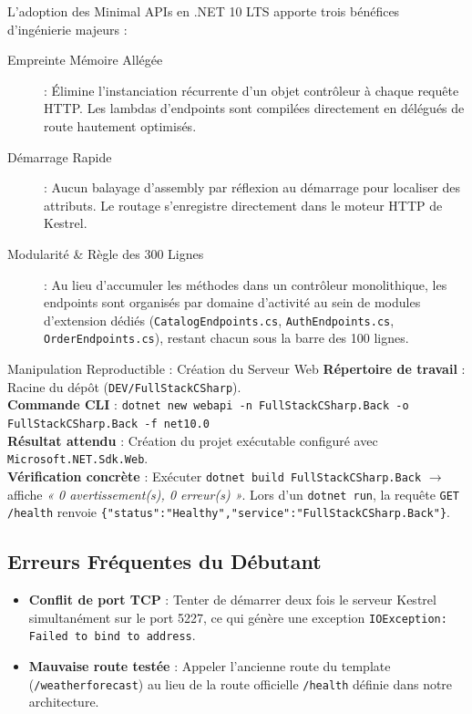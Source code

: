 \documentclass[a4paper,11pt]{report}
\begin{document}
L'adoption des Minimal APIs en .NET 10 LTS apporte trois bénéfices d'ingénierie majeurs :

\begin{description}
    \item[\color{secondary}Empreinte Mémoire Allégée] : Élimine l'instanciation récurrente d'un objet contrôleur à chaque requête HTTP. Les lambdas d'endpoints sont compilées directement en délégués de route hautement optimisés.
    \item[\color{cyanproj!90!black}Démarrage Rapide] : Aucun balayage d'assembly par réflexion au démarrage pour localiser des attributs. Le routage s'enregistre directement dans le moteur HTTP de Kestrel.
    \item[\color{accent}Modularité \& Règle des 300 Lignes] : Au lieu d'accumuler les méthodes dans un contrôleur monolithique, les endpoints sont organisés par domaine d'activité au sein de modules d'extension dédiés (\texttt{CatalogEndpoints.cs}, \texttt{AuthEndpoints.cs}, \texttt{OrderEndpoints.cs}), restant chacun sous la barre des 100 lignes.
\end{description}

\vspace{0.3cm}

\begin{bestpracticebox}{Manipulation Reproductible : Création du Serveur Web}
\textbf{Répertoire de travail} : Racine du dépôt (\texttt{DEV/FullStackCSharp}).\\[2pt]
\textbf{Commande CLI} : \texttt{dotnet new webapi -n FullStackCSharp.Back -o FullStackCSharp.Back -f net10.0}\\[2pt]
\textbf{Résultat attendu} : Création du projet exécutable configuré avec \texttt{Microsoft.NET.Sdk.Web}.\\[2pt]
\textbf{Vérification concrète} : Exécuter \texttt{dotnet build FullStackCSharp.Back} $\longrightarrow$ affiche \textit{« 0 avertissement(s), 0 erreur(s) »}. Lors d'un \texttt{dotnet run}, la requête \texttt{GET /health} renvoie \texttt{\{"status":"Healthy","service":"FullStackCSharp.Back"\}}.
\end{bestpracticebox}

\vspace{0.2cm}

\subsection*{Erreurs Fréquentes du Débutant}

\begin{itemize}
    \item \textbf{Conflit de port TCP} : Tenter de démarrer deux fois le serveur Kestrel simultanément sur le port 5227, ce qui génère une exception \texttt{IOException: Failed to bind to address}.
    \item \textbf{Mauvaise route testée} : Appeler l'ancienne route du template (\texttt{/weatherforecast}) au lieu de la route officielle \texttt{/health} définie dans notre architecture.
\end{itemize}
\end{document}
